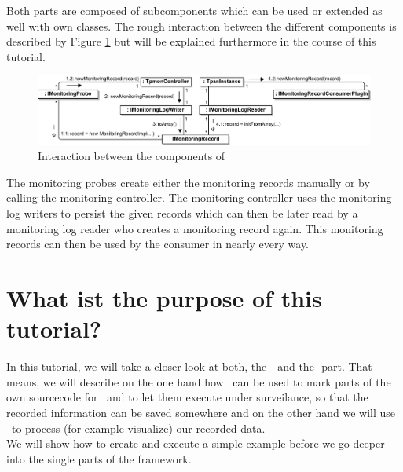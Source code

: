     Both parts are composed of subcomponents which can be used or extended as well with own classes. The rough interaction between the different components is described by Figure \ref{image:interactiondiagramofkieker} but will be explained furthermore in the course of this tutorial.
    \begin{figure}[H]
      \begin{center}
	\includegraphics[width=1.0\textwidth]{kiekerCommunications-revisedReArranged-woMonitoringLog-bw.pdf}
	\caption{Interaction between the components of \Kieker}
	\label{image:interactiondiagramofkieker}
      \end{center}
    \end{figure}
    The monitoring probes create either the monitoring records manually or by calling the monitoring controller. The monitoring controller uses the monitoring log writers to persist the given records which can then be later read by a monitoring log reader who creates a monitoring record again. This monitoring records can then be used by the consumer in nearly every way.

  \section{What ist the purpose of this tutorial?}
    In this tutorial, we will take a closer look at both, the \textbf{\KiekerMonitoring}- and the \textbf{\KiekerAnalysis}-part. That means, we will describe on the one hand how \KiekerMonitoring\ can be used to mark parts of the own sourcecode for \Kieker\ and to let them execute under surveilance, so that the recorded information can be saved somewhere and on the other hand we will use \KiekerAnalysis\ to process (for example visualize) our recorded data.\\
    We will show how to create and execute a simple example before we go deeper into the single parts of the framework.